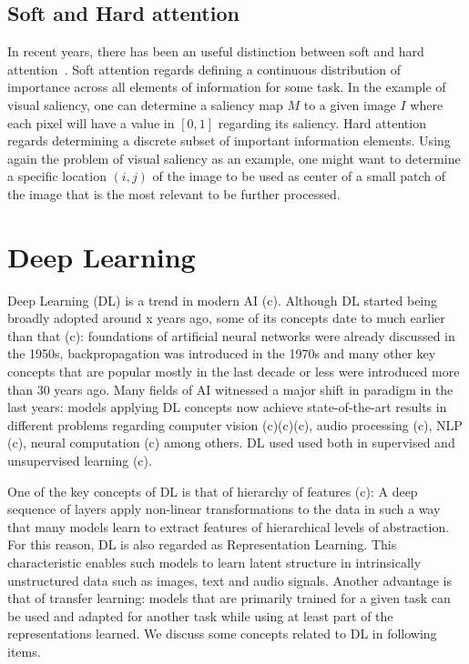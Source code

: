 \documentclass[English]{style/ic-tese-v3}
\begin{document}
\subsection{Soft and Hard attention}
In recent years, there has been an useful distinction between
soft and hard attention~\cite{att-survey}.
Soft attention regards defining a continuous distribution of importance
across all elements of information for some task.
In the example of visual saliency, one can determine a saliency map $M$
to a given image $I$ where each pixel will have a value in $[0, 1]$
regarding its saliency.
Hard attention regards determining a discrete subset of
important information elements.
Using again the problem of visual saliency as an example,
one might want to determine a specific location $(i, j)$ of the image
to be used as center of a small patch of the image that is the most
relevant to be further processed.

\section{Deep Learning}
Deep Learning (DL) is a trend in modern AI (c).
Although DL started being broadly adopted around x years ago,
some of its concepts date to much earlier than that (c):
foundations of artificial neural networks were already discussed
in the 1950s, backpropagation was introduced in the 1970s
and many other key concepts that are popular mostly in the last decade or less
were introduced more than 30 years ago.
Many fields of AI witnessed a major shift in paradigm
in the last years: models applying DL concepts now achieve state-of-the-art
results in different problems regarding computer vision (c)(c)(c),
audio processing (c), NLP (c), neural computation (c) among others.
DL used used both in supervised and unsupervised learning (c).

One of the key concepts of DL is that of hierarchy of features (c):
A deep sequence of layers apply non-linear transformations to the data
in such a way that many models learn to extract features of hierarchical
levels of abstraction.
For this reason, DL is also regarded as Representation Learning.
This characteristic enables such models to learn latent structure
in intrinsically unstructured data such as images, text and audio signals.
Another advantage is that of transfer learning: models that are
primarily trained for a given task can be used and adapted for another
task while using at least part of the representations learned.
We discuss some concepts related to DL in following items.
\end{document}
